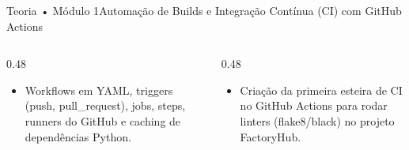 \begin{senaiframe}{Teoria • Módulo 1}{Automação de Builds e Integração Contínua (CI) com GitHub Actions}
  \begin{columns}[t]
    \begin{column}{0.48\textwidth}
      \begin{tcolorbox}[senaibluecard, title={Fundamentos Teóricos}]
        \begin{itemize}
          \item Workflows em YAML, triggers (push, pull_request), jobs, steps, runners do GitHub e caching de dependências Python.
        \end{itemize}
      \end{tcolorbox}
    \end{column}
    \begin{column}{0.48\textwidth}
      \begin{tcolorbox}[senaigreencard, title={Prática \& Laboratório}]
        \begin{itemize}
          \item Criação da primeira esteira de CI no GitHub Actions para rodar linters (flake8/black) no projeto FactoryHub.
        \end{itemize}
      \end{tcolorbox}
    \end{column}
  \end{columns}
\end{senaiframe}

